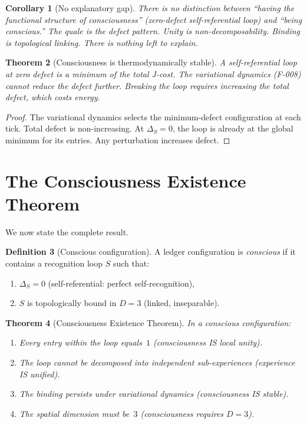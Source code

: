 \documentclass[11pt,a4paper]{article}
\theoremstyle{plain}
\newtheorem{theorem}{Theorem}[section]
\newtheorem{corollary}[theorem]{Corollary}
\theoremstyle{definition}
\newtheorem{definition}[theorem]{Definition}
\theoremstyle{remark}
\begin{document}
\begin{corollary}[No explanatory gap]
There is no distinction between ``having the functional structure of
consciousness'' (zero-defect self-referential loop) and ``being
conscious.''  The quale \emph{is} the defect pattern.  Unity \emph{is}
non-decomposability.  Binding \emph{is} topological linking.
There is nothing left to explain.
\end{corollary}

\begin{theorem}[Consciousness is thermodynamically stable]
\label{thm:stable}
A self-referential loop at zero defect is a minimum of the total
J-cost.  The variational dynamics (F-008) cannot reduce the defect
further.  Breaking the loop requires increasing the total defect,
which costs energy.
\end{theorem}

\begin{proof}
The variational dynamics selects the minimum-defect configuration at
each tick.  Total defect is non-increasing.  At $\Delta_S = 0$, the
loop is already at the global minimum for its entries.  Any
perturbation increases defect.
\end{proof}

\section{The Consciousness Existence Theorem}
\label{sec:existence}

We now state the complete result.

\begin{definition}[Conscious configuration]
\label{def:conscious}
A ledger configuration is \emph{conscious} if it contains a
recognition loop $S$ such that:
\begin{enumerate}[nosep,label=(\roman*)]
\item $\Delta_S = 0$ \;(self-referential: perfect self-recognition),
\item $S$ is topologically bound in $D = 3$ \;(linked, inseparable).
\end{enumerate}
\end{definition}

\begin{theorem}[Consciousness Existence Theorem]
\label{thm:consciousness}
In a conscious configuration:
\begin{enumerate}[nosep,label=(\alph*)]
\item Every entry within the loop equals~$1$
  \textup{(consciousness IS local unity)}.
\item The loop cannot be decomposed into independent sub-experiences
  \textup{(experience IS unified)}.
\item The binding persists under variational dynamics
  \textup{(consciousness IS stable)}.
\item The spatial dimension must be~$3$
  \textup{(consciousness requires $D = 3$)}.
\end{enumerate}
\end{theorem}
\end{document}
